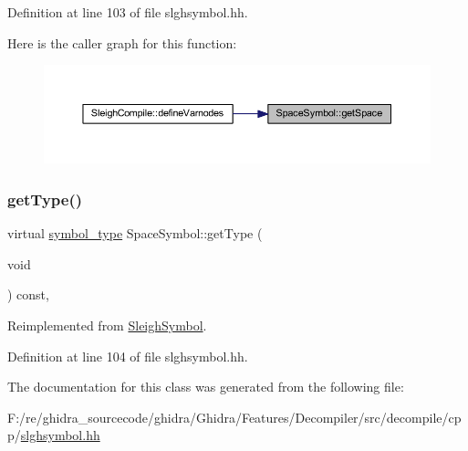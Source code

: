 Definition at line 103 of file slghsymbol.\+hh.

Here is the caller graph for this function\+:
\nopagebreak
\begin{figure}[H]
\begin{center}
\leavevmode
\includegraphics[width=350pt]{class_space_symbol_a25d2176392a721ae6dc112313a67eaae_icgraph}
\end{center}
\end{figure}
\mbox{\label{class_space_symbol_a29f9d6168864570751d9614cd04d827f}} 
\subsubsection{\texorpdfstring{getType()}{getType()}}
{\footnotesize\ttfamily virtual \mbox{\hyperlink{class_sleigh_symbol_aba70f7f332fd63488c5ec4bd7807db41}{symbol\+\_\+type}} Space\+Symbol\+::get\+Type (\begin{DoxyParamCaption}\item[{void}]{ }\end{DoxyParamCaption}) const\hspace{0.3cm}{\ttfamily [inline]}, {\ttfamily [virtual]}}



Reimplemented from \mbox{\hyperlink{class_sleigh_symbol_a2f6e5903e461084c29f95ea024883950}{Sleigh\+Symbol}}.



Definition at line 104 of file slghsymbol.\+hh.



The documentation for this class was generated from the following file\+:\begin{DoxyCompactItemize}
\item 
F\+:/re/ghidra\+\_\+sourcecode/ghidra/\+Ghidra/\+Features/\+Decompiler/src/decompile/cpp/\mbox{\hyperlink{slghsymbol_8hh}{slghsymbol.\+hh}}\end{DoxyCompactItemize}
